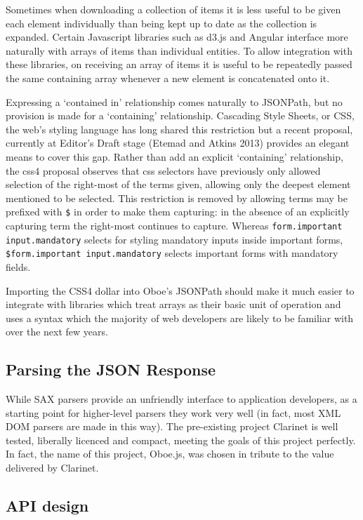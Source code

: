 \documentclass[]{article}
\begin{document}
Sometimes when downloading a collection of items it is less useful to be
given each element individually than being kept up to date as the
collection is expanded. Certain Javascript libraries such as d3.js and
Angular interface more naturally with arrays of items than individual
entities. To allow integration with these libraries, on receiving an
array of items it is useful to be repeatedly passed the same containing
array whenever a new element is concatenated onto it.

Expressing a `contained in' relationship comes naturally to JSONPath,
but no provision is made for a `containing' relationship. Cascading
Style Sheets, or CSS, the web's styling language has long shared this
restriction but a recent proposal, currently at Editor's Draft stage
(Etemad and Atkins 2013) provides an elegant means to cover this gap.
Rather than add an explicit `containing' relationship, the css4 proposal
observes that css selectors have previously only allowed selection of
the right-most of the terms given, allowing only the deepest element
mentioned to be selected. This restriction is removed by allowing terms
may be prefixed with \texttt{\$} in order to make them capturing: in the
absence of an explicitly capturing term the right-most continues to
capture. Whereas \texttt{form.important input.mandatory} selects for
styling mandatory inputs inside important forms,
\texttt{\$form.important input.mandatory} selects important forms with
mandatory fields.

Importing the CSS4 dollar into Oboe's JSONPath should make it much
easier to integrate with libraries which treat arrays as their basic
unit of operation and uses a syntax which the majority of web developers
are likely to be familiar with over the next few years.

\subsection{Parsing the JSON Response}

While SAX parsers provide an unfriendly interface to application
developers, as a starting point for higher-level parsers they work very
well (in fact, most XML DOM parsers are made in this way). The
pre-existing project Clarinet is well tested, liberally licenced and
compact, meeting the goals of this project perfectly. In fact, the name
of this project, Oboe.js, was chosen in tribute to the value delivered
by Clarinet.

\subsection{API design}
\end{document}
